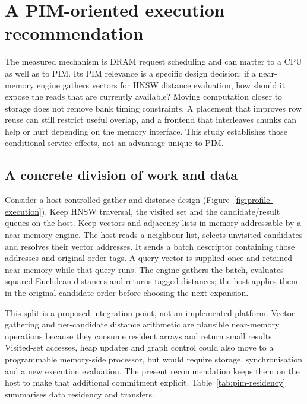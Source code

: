 \section{A PIM-oriented execution recommendation}
\label{sec:execution-sketch}
The measured mechanism is DRAM request scheduling and can matter to a CPU as well as to PIM. Its PIM relevance is a specific design decision: if a near-memory engine gathers vectors for HNSW distance evaluation, how should it expose the reads that are currently available? Moving computation closer to storage does not remove bank timing constraints. A placement that improves row reuse can still restrict useful overlap, and a frontend that interleaves chunks can help or hurt depending on the memory interface. This study establishes those conditional service effects, not an advantage unique to PIM.

\subsection{A concrete division of work and data}
Consider a host-controlled gather-and-distance design (Figure~\ref{fig:profile-execution}). Keep HNSW traversal, the visited set and the candidate/result queues on the host. Keep vectors and adjacency lists in memory addressable by a near-memory engine. The host reads a neighbour list, selects unvisited candidates and resolves their vector addresses. It sends a batch descriptor containing those addresses and original-order tags. A query vector is supplied once and retained near memory while that query runs. The engine gathers the batch, evaluates squared Euclidean distances and returns tagged distances; the host applies them in the original candidate order before choosing the next expansion.

This split is a proposed integration point, not an implemented platform. Vector gathering and per-candidate distance arithmetic are plausible near-memory operations because they consume resident arrays and return small results. Visited-set accesses, heap updates and graph control could also move to a programmable memory-side processor, but would require storage, synchronisation and a new execution evaluation. The present recommendation keeps them on the host to make that additional commitment explicit. Table~\ref{tab:pim-residency} summarises data residency and transfers.

